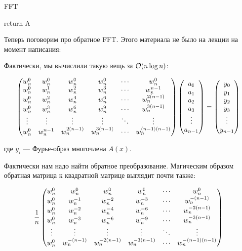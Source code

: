 \documentclass[a4paper, 12pt]{article}
\begin{document}
\begin{algorithm}
  \caption{FFT}
  \begin{algorithmic}[1]
     
    \EndIf
       
    \EndFor
    \State return A
    \EndFunction
  \end{algorithmic}
\end{algorithm}

Теперь поговорим про обратное FFT. Этого материала не было на лекции на момент
написания:

Фактически, мы вычислили такую вещь за $\mathcal{O}(n\log n)$:


\[
  \begin{pmatrix}
    w_n^0 & w_n^0 & w_n^0 & w_n^0 & \cdots & w_n^0 \cr 
    w_n^0 & w_n^1 & w_n^2 & w_n^3 & \cdots & w_n^{n-1} \cr 
    w_n^0 & w_n^2 & w_n^4 & w_n^6 & \cdots & w_n^{2(n-1)} \cr 
    w_n^0 & w_n^3 & w_n^6 & w_n^9 & \cdots & w_n^{3(n-1)} \cr 
    \vdots & \vdots & \vdots & \vdots & \ddots & \vdots \cr 
    w_n^0 & w_n^{n-1} & w_n^{2(n-1)} & w_n^{3(n-1)} & \cdots & w_n^{(n-1)(n-1)}
  \end{pmatrix}
  \begin{pmatrix}
     a_0 \cr 
     a_1 \cr 
     a_2 \cr 
     a_3 \cr 
     \vdots \cr 
     a_{n-1}
  \end{pmatrix}
   =
  \begin{pmatrix}
     y_0 \cr 
     y_1 \cr 
     y_2 \cr 
     y_3 \cr 
     \vdots \cr 
     y_{n-1}
  \end{pmatrix}
\]

где $y_i$ --- Фурье-образ многочлена $A(x)$.

Фактически нам надо найти обратное преобразование. Магическим образом обратная
матрица к квадратной матрице выглядит почти также:

\[
  \frac{1}{n}
  \begin{pmatrix}
    w_n^0 & w_n^0 & w_n^0 & w_n^0 & \cdots & w_n^0 \cr 
    w_n^0 & w_n^{-1} & w_n^{-2} & w_n^{-3} & \cdots & w_n^{-(n-1)} \cr 
    w_n^0 & w_n^{-2} & w_n^{-4} & w_n^{-6} & \cdots & w_n^{-2(n-1)} \cr 
    w_n^0 & w_n^{-3} & w_n^{-6} & w_n^{-9} & \cdots & w_n^{-3(n-1)} \cr 
    \vdots & \vdots & \vdots & \vdots & \ddots & \vdots \cr 
    w_n^0 & w_n^{-(n-1)} & w_n^{-2(n-1)} & w_n^{-3(n-1)} & \cdots & w_n^{-(n-1)(n-1)}
  \end{pmatrix}
\]
\end{document}
